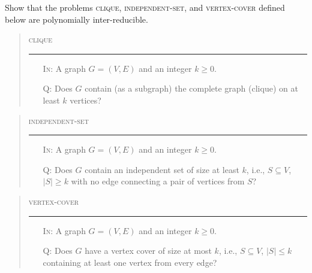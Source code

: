 \documentclass[a4paper,12pt]{amsart}
\begin{document}
    \medskip\begin{problem}
        Show that the problems \textsc{clique}, \textsc{independent-set}, and \textsc{vertex-cover} defined below are polynomially inter-reducible. 
        
        \bigskip
        \begin{quote}
        \begin{mdframed}
        \textsc{clique}
        \medskip\hrule\medskip
        \begin{itemize}
            \item[\textsc{In:}] A graph $G=(V,E)$ and an integer $k\geq 0$.
            \item[\textsc{Q:}] Does $G$ contain (as a subgraph) the complete graph (clique) on at least $k$ vertices?
        \end{itemize}
        \end{mdframed}
        \end{quote}
        
        \bigskip
        \begin{quote}
        \begin{mdframed}
        \textsc{independent-set}
        \medskip\hrule\medskip
        \begin{itemize}
            \item[\textsc{In:}] A graph $G=(V,E)$ and an integer $k\geq 0$.
            \item[\textsc{Q:}] Does $G$ contain an independent set of size at least $k$, i.e., $S\subseteq V$, $|S|\geq k$ with no edge connecting a pair of vertices from $S$?
        \end{itemize}
        \end{mdframed}
        \end{quote}
        
        \bigskip
        \begin{quote}
        \begin{mdframed}
        \textsc{vertex-cover}
        \medskip\hrule\medskip
        \begin{itemize}
            \item[\textsc{In:}] A graph $G=(V,E)$ and an integer $k\geq 0$.
            \item[\textsc{Q:}] Does $G$ have a vertex cover of size at most $k$, i.e., $S\subseteq V$, $|S|\leq k$ containing at least one vertex from every edge?
        \end{itemize}
        \end{mdframed}
        \end{quote}
        
        \end{problem}
        
\end{document}
